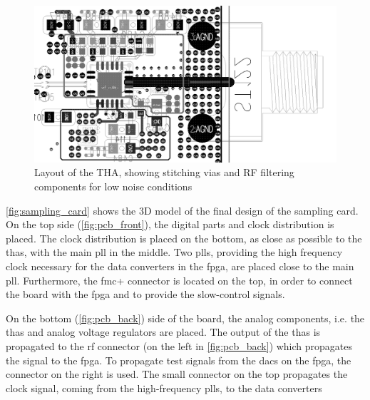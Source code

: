  \begin{figure}[tb]
 	\centering
 	\includegraphics[width = \textwidth]{chap/04-theresa/img/pcb/tha_pcb}
 	\caption[THA layout]{Layout of the THA, showing stitching vias and RF filtering components for low noise conditions}
 	\label{fig:stitch}
 \end{figure}

\autoref{fig:sampling_card} shows the 3D model of the final design of the sampling card.
On the top side (\autoref{fig:pcb_front}), the digital parts and clock distribution is placed. 
The clock distribution is placed on the bottom, as close as possible to the \glspl{tha}, with the main \gls{pll} in the middle.
Two \glspl{pll}, providing the high frequency clock necessary for the data converters in the \gls{fpga}, are placed close to the main \gls{pll}.
Furthermore, the \gls{fmc}+ connector is located on the top, in order to connect the board with the \gls{fpga} and to provide the slow-control signals.

On the bottom (\autoref{fig:pcb_back}) side of the board, the analog components, i.e. the \glspl{tha} and analog voltage regulators are placed. 
The output of the \glspl{tha} is propagated to the \gls{rf} connector (on the left in \autoref{fig:pcb_back}) which propagates the signal to the \gls{fpga}. 
To propagate test signals from the \glspl{dac} on the \gls{fpga}, the connector on the right is used.
The small connector on the top propagates the clock signal, coming from the high-frequency \glspl{pll}, to the data converters 

